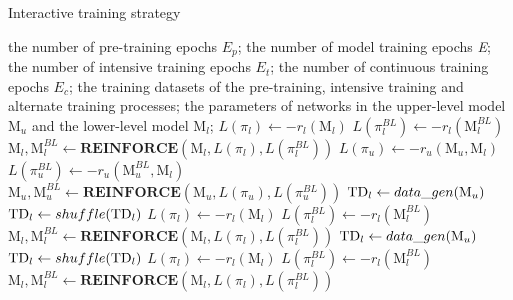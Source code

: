 \documentclass[lettersize,journal]{IEEEtran}
\begin{document}
	\begin{small}
		\begin{algorithm}
			\caption{Interactive training strategy}\label{algorithm1}
			\begin{algorithmic}[1]
				\Require
				the number of pre-training epochs ${{E}_{p}}$;
				the number of model training epochs \textit{E};
				the number of intensive training epochs ${{E}_{t}}$;
				the number of continuous training epochs ${{E}_{c}}$;
				\Ensure
				the training datasets of the pre-training, intensive training and alternate training processes;
				the parameters of networks in the upper-level model ${{\mathrm{M}}_{u}}$ and the lower-level model ${{\mathrm{M}}_{l}}$;
				\State $L(\pi_l)\gets -r_l({\mathrm{M}}_{l})$ 
				\State $L\left(\pi_l^{BL}\right)\gets{-r}_l\left({\mathrm{M}}_{l}^{BL}\right)$
				\State ${{\mathrm{M}}_{l}},{\mathrm{M}}_{l}^{BL}\gets\textbf{REINFORCE}({{\mathrm{M}}_{l}},L(\pi_l),L(\pi_l^{BL}))$
				\EndFor
				\State $L(\pi_u)\gets -r_u({\mathrm{M}}_{u},{{\mathrm{M}}_{l}})$ 
				\State $L\left(\pi_u^{BL}\right)\gets{-r}_u\left({\mathrm{M}}_{u}^{BL},{{\mathrm{M}}_{l}}\right)$
				\State ${{\mathrm{M}}_{u},{\mathrm{M}}_{u}^{BL}}\gets\textbf{REINFORCE}({{\mathrm{M}}_{u}},L(\pi_u),L(\pi_u^{BL}))$
				\State ${\rm TD}_l\gets data\_gen({\mathrm{M}}_{u})$
				\State ${\rm TD}_l\gets shuffle({\rm TD}_l)$
				\State $L(\pi_l)\gets -r_l({\mathrm{M}}_{l})$
				\State $L\left(\pi_l^{BL}\right)\gets{-r}_l\left({\mathrm{M}}_{l}^{BL}\right)$
				\State ${{\mathrm{M}}_{l}},{\mathrm{M}}_{l}^{BL}\gets\textbf{REINFORCE}({{\mathrm{M}}_{l}},L(\pi_l),L(\pi_l^{BL}))$
				\EndIf
				\Else 
				\State ${\rm TD}_l\gets data\_gen({\mathrm{M}}_{u})$
				\State ${\rm TD}_l\gets shuffle({\rm TD}_l)$
				\State $L(\pi_l)\gets -r_l({\mathrm{M}}_{l})$
				\State $L\left(\pi_l^{BL}\right)\gets{-r}_l\left({\mathrm{M}}_{l}^{BL}\right)$
				\State ${{\mathrm{M}}_{l}},{\mathrm{M}}_{l}^{BL}\gets\textbf{REINFORCE}({{\mathrm{M}}_{l}},L(\pi_l),L(\pi_l^{BL}))$
				\EndIf
				\EndFor
			\end{algorithmic}
		\end{algorithm}
	\end{small}
	
\end{document}
